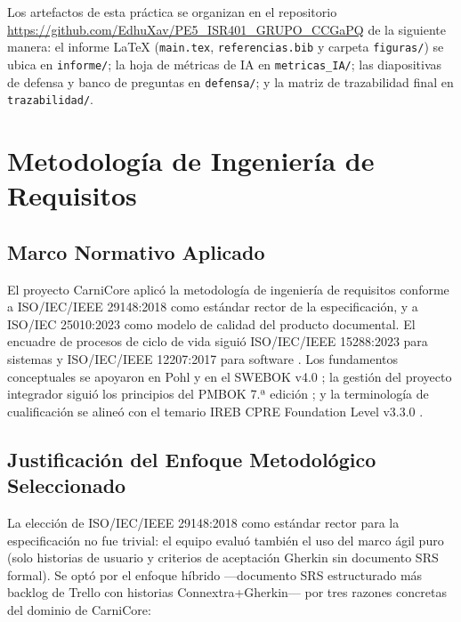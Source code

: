 \documentclass[11pt,a4paper]{article}
\begin{document}
Los artefactos de esta práctica se organizan en el repositorio \url{https://github.com/EdhuXav/PE5_ISR401_GRUPO_CCGaPQ} de la siguiente manera: el informe LaTeX (\texttt{main.tex}, \texttt{referencias.bib} y carpeta \texttt{figuras/}) se ubica en \texttt{informe/}; la hoja de métricas de IA en \texttt{metricas\_IA/}; las diapositivas de defensa y banco de preguntas en \texttt{defensa/}; y la matriz de trazabilidad final en \texttt{trazabilidad/}.

\section{Metodología de Ingeniería de Requisitos}
\label{sec:metodologia}

\subsection{Marco Normativo Aplicado}

El proyecto CarniCore aplicó la metodología de ingeniería de requisitos conforme a ISO/IEC/IEEE 29148:2018 \cite{iso29148} como estándar rector de la especificación, y a ISO/IEC 25010:2023 \cite{iso25010} como modelo de calidad del producto documental. El encuadre de procesos de ciclo de vida siguió ISO/IEC/IEEE 15288:2023 para sistemas \cite{iso15288} y ISO/IEC/IEEE 12207:2017 para software \cite{iso12207}. Los fundamentos conceptuales se apoyaron en Pohl \cite{pohl2025} y en el SWEBOK v4.0 \cite{swebok2024}; la gestión del proyecto integrador siguió los principios del PMBOK 7.ª edición \cite{pmbok7}; y la terminología de cualificación se alineó con el temario IREB CPRE Foundation Level v3.3.0 \cite{ireb330}.

\subsection{Justificación del Enfoque Metodológico Seleccionado}

La elección de ISO/IEC/IEEE 29148:2018 \cite{iso29148} como estándar rector para la especificación no fue trivial: el equipo evaluó también el uso del marco ágil puro (solo historias de usuario y criterios de aceptación Gherkin sin documento SRS formal). Se optó por el enfoque híbrido ---documento SRS estructurado más backlog de Trello con historias Connextra+Gherkin--- por tres razones concretas del dominio de CarniCore:
\end{document}
